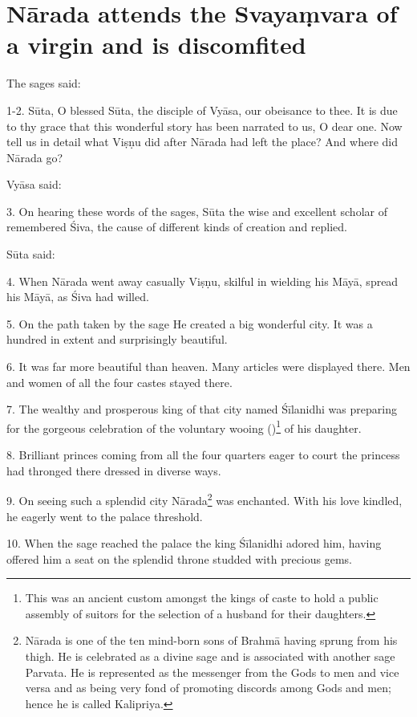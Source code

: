 \chapter{Nārada attends the Svayaṃvara of a virgin and is discomfited}

The sages said:

1-2. Sūta, O blessed Sūta, the disciple of Vyāsa, our obeisance to thee. It is
due to thy grace that this wonderful story has been narrated to us, O dear one.
Now tell us in detail what Viṣṇu did after Nārada had left the place? And where
did Nārada go?

Vyāsa said:

3. On hearing these words of the sages, Sūta the wise and excellent scholar of
 remembered Śiva, the cause of different kinds of creation and
replied.

Sūta said:

4. When Nārada went away casually Viṣṇu, skilful in wielding his Māyā, spread
his Māyā, as Śiva had willed.

5. On the path taken by the sage He created a big wonderful city. It was
a hundred  in extent and surprisingly beautiful.

6. It was far more beautiful than heaven. Many articles were displayed there.
Men and women of all the four castes stayed there.

7. The wealthy and prosperous king of that city named Śīlanidhi was preparing
for the gorgeous celebration of the voluntary wooing ()\footnote{
This was an ancient custom amongst the kings of  caste to hold
a public assembly of suitors for the selection of a husband for their daughters.}
of his daughter.

8. Brilliant princes coming from all the four quarters eager to court
the princess had thronged there dressed in diverse ways.

9. On seeing such a splendid city Nārada\footnote{Nārada is one of the ten
mind-born sons of Brahmā having sprung from his thigh. He is celebrated as
a divine sage and is associated with another sage Parvata. He is represented as
the messenger from the Gods to men and vice versa and as being very fond of
promoting discords among Gods and men; hence he is called Kalipriya.} was
enchanted. With his love kindled, he eagerly went to the palace threshold.

10. When the sage reached the palace the king Śīlanidhi adored him, having
offered him a seat on the splendid throne studded with precious gems.

